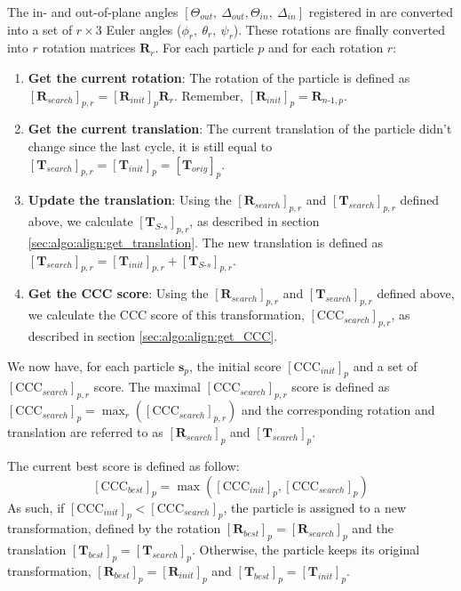 The in- and out-of-plane angles $[\Theta_{out},\ \Delta_{out}, \Theta_{in},\ \Delta_{in}]$ registered in  are converted into a set of $r \times 3$ Euler angles ($\phi_{r},\ \theta_{r},\ \psi_{r}$). These rotations are finally converted into $r$ rotation matrices $\bm{R}_{r}$. For each particle $p$ and for each rotation $r$:

\begin{enumerate}
    \item \textbf{Get the current rotation}: The rotation of the particle is defined as ${[\bm{R}_{search}]}_{p,r} = {[\bm{R}_{init}]}_p \bm{R}_{r}$. Remember, ${[\bm{R}_{init}]}_p = \bm{R}_{n\text{-}1,p}$.
    
    \item \textbf{Get the current translation}: The current translation of the particle didn't change since the last cycle, it is still equal to  ${[\bm{T}_{search}]}_{p,r} = {[\bm{T}_{init}]}_{p} = {[\bm{T}_{orig}]}_p$.
    
    \item \textbf{Update the translation}: Using the ${[\bm{R}_{search}]}_{p,r}$ and ${[\bm{T}_{search}]}_{p,r}$ defined above, we calculate ${[\bm{T}_{S\text{-}s}]}_{p,r}$, as described in section \ref{sec:algo:align:get_translation}. The new translation is defined as ${[\bm{T}_{search}]}_{p,r} = {[\bm{T}_{init}]}_{p,r} + {[\bm{T}_{S\text{-}s}]}_{p,r}$.
    
    \item \textbf{Get the CCC score}: Using the ${[\bm{R}_{search}]}_{p,r}$ and ${[\bm{T}_{search}]}_{p,r}$ defined above, we calculate the CCC score of this transformation, ${[\bm{\mathrm{CCC}}_{search}]}_{p,r}$, as described in section \ref{sec:algo:align:get_CCC}.
    
\end{enumerate}

We now have, for each particle $\bm{s}_{p}$, the initial score ${[\bm{\mathrm{CCC}}_{init}]}_{p}$ and a set of ${[\bm{\mathrm{CCC}}_{search}]}_{p,r}$ score. The maximal ${[\bm{\mathrm{CCC}}_{search}]}_{p,r}$ score is defined as ${[\bm{\mathrm{CCC}}_{search}]}_{p} = \max_{r}({[\bm{\mathrm{CCC}}_{search}]}_{p,r})$ and the corresponding rotation and translation are referred to as ${[\bm{R}_{search}]}_p$ and ${[\bm{T}_{search}]}_p$.

The current best score is defined as follow:
\begin{equation}
    {[\bm{\mathrm{CCC}}_{best}]}_{p} = \max \left( {[\bm{\mathrm{CCC}}_{init}]}_{p}, {[\bm{\mathrm{CCC}}_{search}]}_{p} \right)
\end{equation}
As such, if ${[\bm{\mathrm{CCC}}_{init}]}_{p} < {[\bm{\mathrm{CCC}}_{search}]}_{p}$, the particle is assigned to a new transformation, defined by the rotation ${[\bm{R}_{best}]}_p = {[\bm{R}_{search}]}_p$ and the translation ${[\bm{T}_{best}]}_p = {[\bm{T}_{search}]}_p$. Otherwise, the particle keeps its original transformation, ${[\bm{R}_{best}]}_p = {[\bm{R}_{init}]}_p$ and ${[\bm{T}_{best}]}_p = {[\bm{T}_{init}]}_p$.

